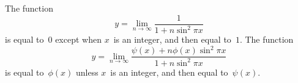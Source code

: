 The function
\[
y = \lim_{n \to \infty} \frac{1}{1 + n\sin^{2} \pi x}
\]
is equal to~$0$ except when $x$~is an integer, and then equal to~$1$. The function
\[
y = \lim_{n \to \infty} \frac{\psi(x) + n\phi(x) \sin^{2}\pi x}{1 + n\sin^{2}\pi x}
\]
is equal to~$\phi(x)$ unless $x$~is an integer, and then equal to~$\psi(x)$.


